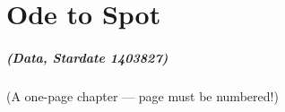 \chapter{Ode to Spot}	\OnePageChapter         %

\noindent\paragraph{(Data, Stardate 1403827)}
(A one-page chapter --- page must be numbered!)






